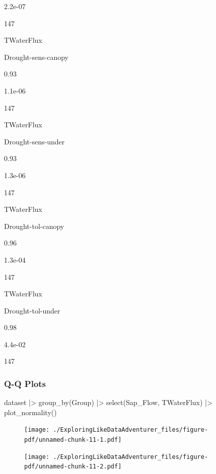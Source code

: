 \documentclass[
  letterpaper,
  DIV=11,
  numbers=noendperiod]{scrreprt}
\newenvironment{Shaded}{\begin{snugshade}}{\end{snugshade}}
\newcommand{\FunctionTok}[1]{\textcolor[rgb]{0.28,0.35,0.67}{#1}}
\newcommand{\NormalTok}[1]{\textcolor[rgb]{0.00,0.23,0.31}{#1}}
\newcommand{\SpecialCharTok}[1]{\textcolor[rgb]{0.37,0.37,0.37}{#1}}
\begin{document}
2.2e-07

147

TWaterFlux

Drought-sens-canopy

0.93

1.1e-06

147

TWaterFlux

Drought-sens-under

0.93

1.3e-06

147

TWaterFlux

Drought-tol-canopy

0.96

1.3e-04

147

TWaterFlux

Drought-tol-under

0.98

4.4e-02

147

\hypertarget{q-q-plots-1}{%
\subsubsection{Q-Q Plots}\label{q-q-plots-1}}

\begin{Shaded}
\begin{Highlighting}[]
\NormalTok{dataset }\SpecialCharTok{|\textgreater{}}
\FunctionTok{group\_by}\NormalTok{(Group) }\SpecialCharTok{|\textgreater{}}
  \FunctionTok{select}\NormalTok{(Sap\_Flow, TWaterFlux) }\SpecialCharTok{|\textgreater{}}
  \FunctionTok{plot\_normality}\NormalTok{()}
\end{Highlighting}
\end{Shaded}

\begin{figure}[H]

{\centering \texttt{[image: ./ExploringLikeDataAdventurer\_files/figure-pdf/unnamed-chunk-11-1.pdf]}

}

\end{figure}

\begin{figure}[H]

{\centering \texttt{[image: ./ExploringLikeDataAdventurer\_files/figure-pdf/unnamed-chunk-11-2.pdf]}

}

\end{figure}
\end{document}
